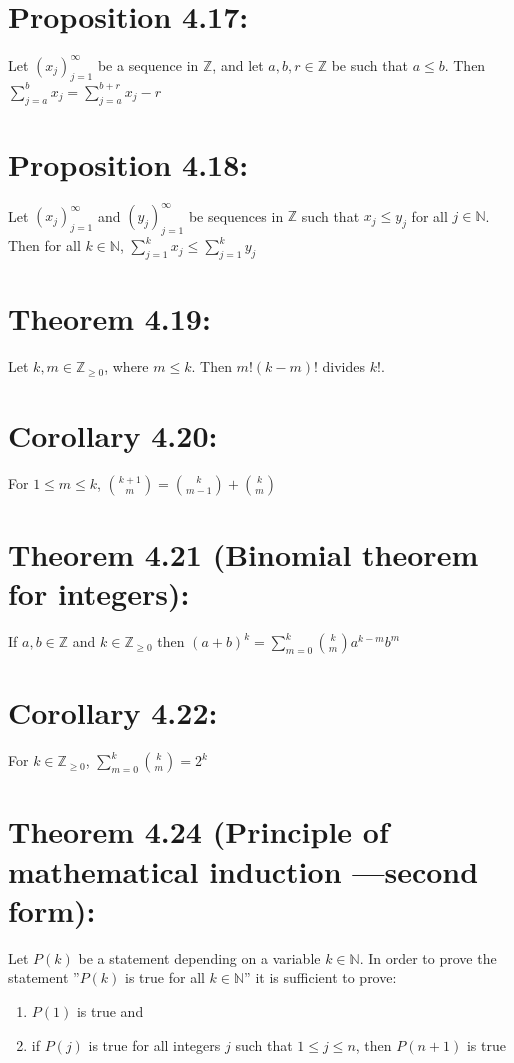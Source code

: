 \section*{Proposition 4.17:}
Let $(x_j)_{j=1}^{\infty}$ be a sequence in $\mathbb{Z}$, and let $a,b, r \in \mathbb{Z}$ be such that $a \leq b$. Then
$\displaystyle\sum_{j=a}^{b} x_j = \displaystyle\sum_{j=a}^{b+r} x_j - r$

\section*{Proposition 4.18:}
Let $(x_j)_{j=1}^{\infty}$ and $(y_j)_{j=1}^{\infty}$ be sequences in $\mathbb{Z}$ such that $x_j \leq y_j$ for all $j \in \mathbb{N}$. Then for all $k \in \mathbb{N}$,
$\displaystyle\sum_{j=1}^{k} x_j \leq \displaystyle\sum_{j=1}^{k} y_j$

\section*{Theorem 4.19:}
Let $k,m \in \mathbb{Z}_{\geq 0}$, where $m \leq k$. Then $m!(k-m)!$ divides $k!$.

\section*{Corollary 4.20:}
For $1 \leq m \leq k$,
$\binom{k+1}{m} = \binom{k}{m-1} + \binom{k}{m}$

\section*{Theorem 4.21 (Binomial theorem for integers):}
If $a,b \in \mathbb{Z}$ and $k \in \mathbb{Z}_{\geq 0}$ then
$(a+b)^k = \displaystyle\sum_{m=0}^{k} \binom{k}{m} a^{k-m} b^m$

\section*{Corollary 4.22:}
For $k \in \mathbb{Z}_{\geq 0}$,
$\displaystyle\sum_{m=0}^{k} \binom{k}{m} = 2^k$

\section*{Theorem 4.24 (Principle of mathematical induction —second form):}
Let $P(k)$ be a statement depending on a variable $k \in \mathbb{N}$. In order to prove the statement ”$P(k)$ is true for all $k \in \mathbb{N}$” it is sufficient to prove:
\begin{enumerate}
    \item $P(1)$ is true and
    \item if $P(j)$ is true for all integers $j$ such that $1 \leq j \leq n$, then $P(n+1)$ is true
\end{enumerate}

